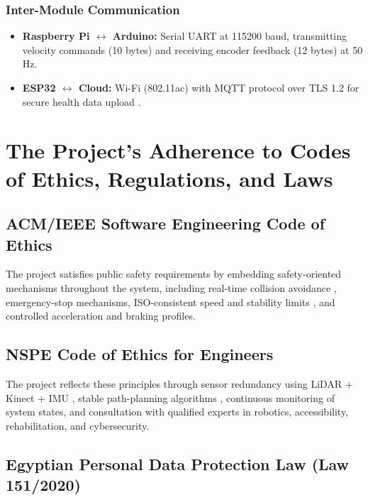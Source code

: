 \documentclass[12pt,a4paper]{report}
\begin{document}
\subsubsection{Inter-Module Communication}

\begin{itemize}
    \item \textbf{Raspberry Pi $\leftrightarrow$ Arduino:} Serial UART at 115200 baud, transmitting velocity commands (10 bytes) and receiving encoder feedback (12 bytes) at 50 Hz.
    \item \textbf{ESP32 $\leftrightarrow$ Cloud:} Wi-Fi (802.11ac) with MQTT protocol over TLS 1.2 for secure health data upload \cite{sonekar_2024}.
\end{itemize}

\section{The Project's Adherence to Codes of Ethics, Regulations, and Laws}

\subsection{ACM/IEEE Software Engineering Code of Ethics}

The project satisfies public safety requirements by embedding safety-oriented mechanisms throughout the system, including real-time collision avoidance \cite{iso13482}, emergency-stop mechanisms, ISO-consistent speed and stability limits \cite{iso7176_6}, and controlled acceleration and braking profiles.

\subsection{NSPE Code of Ethics for Engineers}

The project reflects these principles through sensor redundancy using LiDAR + Kinect + IMU \cite{orbslam3}, stable path-planning algorithms \cite{nav2}, continuous monitoring of system states, and consultation with qualified experts in robotics, accessibility, rehabilitation, and cybersecurity.

\subsection{Egyptian Personal Data Protection Law (Law 151/2020)}
\end{document}
